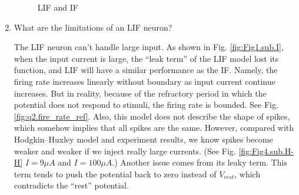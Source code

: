 \documentclass[11pt]{article}
\begin{document}
\begin{enumerate}
			\begin{figure}[htb]
			\centering
			\caption{LIF and IF}
			\end{figure}
			
		\item What are the limitations of an LIF neuron?
			
		The LIF neuron can't handle large input. As shown in Fig. \ref{fig:Fig1.sub.I}, when the input current is large, the ``leak term'' of the LIF model lost its function, and LIF will have a similar performance as the IF. Namely, the firing rate increases linearly without boundary as input current continue increases. But in reality, because of the refractory period in which the potential does not respond to stimuli, the firing rate is bounded. See Fig. \ref{fig:q2.fire_rate_ref}. Also, this model does not describe the shape of spikes, which somehow implies that all spikes are the same. However, compared with Hodgkin–Huxley model and experiment results, we know spikes become weaker and weaker if we inject really large currents. (See Fig. \ref{fig:Fig4.sub.H-H} $I = 9 \mu A$ and $I = 100 \mu A$.) Another issue comes from its leaky term. This term tends to push the potential back to zero instead of $V_{rest}$, which contradicts the ``rest'' potential.
			
	\end{enumerate}
	
\end{document}
